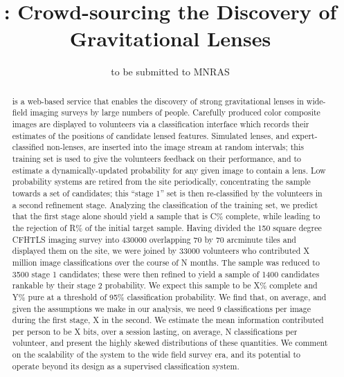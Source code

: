 \documentclass[useAMS,usenatbib,a4paper]{mn2e}
\title[\sw]
{\SW: Crowd-sourcing the Discovery of Gravitational Lenses}
\author[Marshall et al.]{%
  
}
\begin{document}
             
\date{to be submitted to MNRAS}
\pagerange{\pageref{firstpage}--\pageref{lastpage}}

\maketitle           

\label{firstpage}


\begin{abstract} 

\sw is a web-based service that enables the discovery of strong gravitational
lenses in wide-field imaging surveys by large numbers of people. Carefully
produced color composite images are displayed to volunteers via a
classification interface which records their estimates of the positions of
candidate lensed features. Simulated lenses, and expert-classified non-lenses,
are inserted into the image stream at random intervals; this training set is
used to give the volunteers feedback on their performance, and to estimate a
dynamically-updated probability for any given image to contain a lens. Low
probability systems are retired from the site periodically, concentrating the
sample towards a set of candidates; this ``stage 1'' set is then re-classified
by the volunteers in a second  refinement stage. Analyzing the classification
of the training set, we predict that the first stage alone should yield a
sample that is C\% complete, while leading to the rejection of R\% of the
initial target sample. Having divided the 150 square degree CFHTLS imaging
survey into 430000 overlapping 70 by 70 arcminute tiles and displayed them on
the site, we were joined by 33000 volunteers who contributed X million image
classifications over the course of N months. The sample was reduced to 3500
stage 1 candidates; these were then refined to yield a sample of 1400
candidates rankable by their stage 2 probability. We expect this sample to be
X\% complete and Y\% pure at a threshold of 95\% classification probability.
We find that, on average, and given the assumptions we make in our analysis,
we need 9 classifications per image during the first stage, X in the second.
We estimate the mean information contributed per person to be X bits, over a
session lasting, on average, N classifications per volunteer, and present the
highly skewed distributions of these quantities. We comment on the scalability
of the \sw system to the wide field survey era, and its potential to operate
beyond its design as a supervised classification system. 

\end{abstract}
\end{document}
